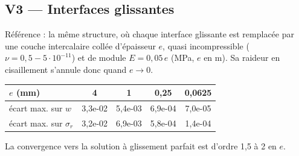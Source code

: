 \subsection{V3 --- Interfaces glissantes}
Référence : la même structure, où chaque interface glissante est remplacée par une couche
intercalaire collée d'épaisseur $e$, quasi incompressible ($\nu=0{,}5-5\cdot10^{-11}$) et de
module $E=0{,}05\,e$ (MPa, $e$ en m). Sa raideur en cisaillement s'annule donc quand $e\to0$.
\begin{center}\small
\begin{tabular}{lcccc}
\toprule
$e$ (mm) & 4 & 1 & 0,25 & 0,0625\\
\midrule
écart max. sur $w$ & 3,3e-02 & 5,4e-03 & 6,9e-04 & 7,0e-05\\
écart max. sur $\sigma_r$ & 3,2e-02 & 6,9e-03 & 5,8e-04 & 1,4e-04\\
\bottomrule
\end{tabular}
\end{center}
La convergence vers la solution à glissement parfait est d'ordre 1,5 à 2 en $e$.

